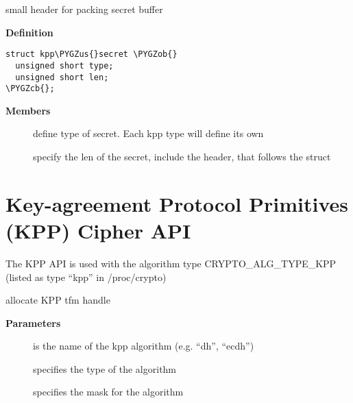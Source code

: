 \documentclass[a4paper,8pt,english]{sphinxmanual}
\def\PYGZus{\char`\_}
\def\PYGZob{\char`\{}
\def\PYGZcb{\char`\}}
\begin{document}
\begin{fulllineitems}
\label{crypto/api-kpp:c.kpp_secret}
small header for packing secret buffer

\end{fulllineitems}


\textbf{Definition}

\begin{Verbatim}[commandchars=\\\{\}]
struct kpp\PYGZus{}secret \PYGZob{}
  unsigned short type;
  unsigned short len;
\PYGZcb{};
\end{Verbatim}

\textbf{Members}
\begin{description}
\item[{}] \leavevmode
define type of secret. Each kpp type will define its own

\item[{}] \leavevmode
specify the len of the secret, include the header, that
follows the struct

\end{description}


\section{Key-agreement Protocol Primitives (KPP) Cipher API}
\label{crypto/api-kpp:key-agreement-protocol-primitives-kpp-cipher-api}
The KPP API is used with the algorithm type
CRYPTO\_ALG\_TYPE\_KPP (listed as type ``kpp'' in /proc/crypto)

\begin{fulllineitems}
\label{crypto/api-kpp:c.crypto_alloc_kpp}
allocate KPP tfm handle

\end{fulllineitems}


\textbf{Parameters}
\begin{description}
\item[{}] \leavevmode
is the name of the kpp algorithm (e.g. ``dh'', ``ecdh'')

\item[{}] \leavevmode
specifies the type of the algorithm

\item[{}] \leavevmode
specifies the mask for the algorithm

\end{description}
\end{document}
